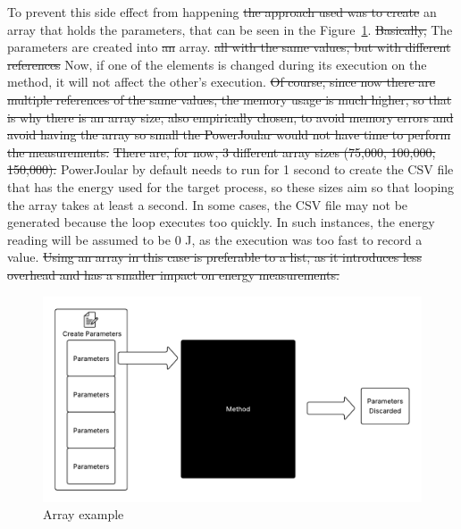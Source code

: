 To prevent this side effect from happening \st{the approach used was to create}  an array that holds the parameters, that can be seen in the Figure~\ref{fig:array}. \st{Basically, }The  parameters  are created  into \st{an}  array. \st{all with the same values, but with different references}  Now, if one of the elements is changed during its execution on the method, it will not affect the other's execution. \st{Of course, since now there are multiple references of the same values, the memory usage is much higher, so that is why there is an array size, also empirically chosen, to avoid memory errors and avoid having the array so small the PowerJoular would not have time to perform the measurements.}  \st{There are, for now, 3 different array sizes (75,000, 100,000, 150,000).} PowerJoular by default needs to run for 1 second to create the CSV file that has the energy used for the target process, so these sizes aim so that looping the array takes at least a second. In some cases, the CSV file may not be generated because the loop executes too quickly. In such instances, the energy reading will be assumed to be 0 J, as the execution was too fast to record a value. \st{Using an array in this case is preferable to a list, as it introduces less overhead and has a smaller impact on energy measurements.}


\begin{figure}[htbp]
  \centering
  \includegraphics[width = 1 \textwidth]{figures/array.pdf}
  \caption{Array example}
  \label{fig:array}
\end{figure}

